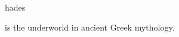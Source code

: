 \documentclass{stex}
\begin{document}
\begin{smodule}{hades}
\begin{sparagraph}[style=symdoc]
 is the underworld in ancient Greek mythology.
\end{sparagraph}
\end{smodule}
\end{document}
